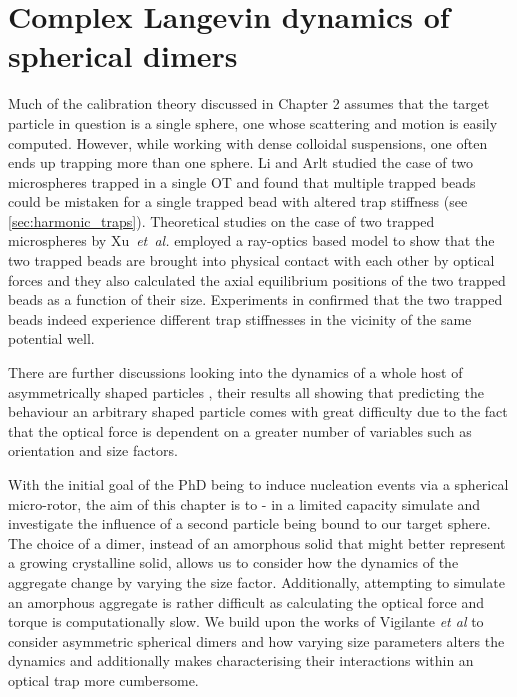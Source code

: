 \chapter{Complex Langevin dynamics of spherical dimers}
\label{chapter:langevin_dynamics}
Much of the calibration theory discussed in Chapter 2 assumes that the
target particle in question is a single sphere, one whose scattering and 
motion is easily computed. However, while working with dense colloidal 
suspensions, one often ends up trapping more than one sphere. Li and 
Arlt \cite{Li2008} studied the case of two microspheres trapped in a single 
OT and found that multiple trapped beads could be mistaken for a single 
trapped bead with altered trap stiffness (see \ref{sec:harmonic_traps}). Theoretical studies on the case of two trapped microspheres by Xu~\textit{et~al.} \cite{Xu2005} employed a ray-optics based model to show 
that the two trapped beads are brought into physical contact with each 
other by optical forces and they also calculated the axial equilibrium positions of the two trapped beads as a function of their size. Experiments 
in \cite{Praveen2016} confirmed that the two trapped beads indeed experience different trap stiffnesses in the vicinity of the same potential well.
 
There are further discussions looking into the dynamics 
of a whole host of asymmetrically shaped particles \cite{Loudet2014, ShengHua2005, Chetana2022}, their results all showing that predicting the behaviour an arbitrary shaped particle comes with great difficulty due to 
the fact that the optical force is dependent on a greater number of variables such as orientation and size factors.

With the initial goal of the PhD being to induce nucleation events via a 
spherical micro-rotor, the aim of this chapter is to - in a limited capacity
simulate and investigate the influence of a second particle being bound to our 
target sphere. The choice of a dimer, instead of an amorphous solid that 
might better represent a growing crystalline solid, allows us to consider 
how the dynamics of the aggregate change by varying the size factor. 
Additionally, attempting to simulate an amorphous aggregate is rather difficult 
as calculating the optical force and torque is computationally slow. We build 
upon the works of Vigilante \textit{et al} \cite{Vigilante2020} to consider 
asymmetric spherical dimers and how varying size parameters alters the 
dynamics and additionally makes characterising their interactions within an optical trap more cumbersome. 

